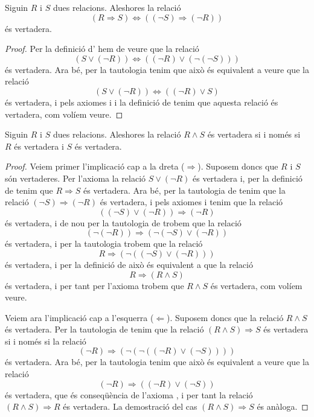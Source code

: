 \documentclass[../Apunts.tex]{subfiles}
\begin{document}
	\begin{tautology}
		\label{taut:llei de les contrarecíproques}
		Siguin \(R\) i \(S\) dues relacions. Aleshores la relació
		\[(R\Rightarrow S)\Leftrightarrow((\lnot S)\Rightarrow(\lnot R))\]
		és vertadera.
		\begin{proof}
			Per la definició d' hem de veure que la relació
			\[(S\lor(\lnot R))\Leftrightarrow((\lnot R)\lor(\lnot(\lnot S)))\]
			és vertadera. Ara bé, per la tautologia  tenim que això és equivalent a veure que la relació
			\[(S\lor(\lnot R))\Leftrightarrow((\lnot R)\lor S)\]
			és vertadera, i pels axiomes  i  i la definició de  tenim que aquesta relació és vertadera, com volíem veure.
		\end{proof}
	\end{tautology}
	\begin{tautology}
		\label{taut:condició equivalent a conjunció}
		Siguin \(R\) i \(S\) dues relacions. Aleshores la relació \(R\land S\) és vertadera si i només si \(R\) és vertadera i \(S\) és vertadera.
		\begin{proof}
			Veiem primer l'implicació cap a la dreta (\(\Rightarrow\)). Suposem doncs que \(R\) i \(S\) són vertaderes. Per l'axioma  la relació \(S\lor(\lnot R)\) és vertadera i, per la definició de  tenim que \(R\Rightarrow S\) és vertadera. Ara bé, per la tautologia de  tenim que la relació \((\lnot S)\Rightarrow(\lnot R)\) és vertadera, i pels axiomes  i  tenim que la relació
			\[((\lnot S)\lor(\lnot R))\Rightarrow(\lnot R)\]
			és vertadera, i de nou per la tautologia de  trobem que la relació
			\[(\lnot(\lnot R))\Rightarrow(\lnot(\lnot S)\lor(\lnot R))\]
			és vertadera, i per la tautologia  trobem que la relació
			\[R\Rightarrow(\lnot((\lnot S)\lor(\lnot R)))\]
			és vertadera, i per la definició de  això és equivalent a que la relació
			\[R\Rightarrow(R\land S)\]
			és vertadera, i per tant per l'axioma  trobem que \(R\land S\) és vertadera, com volíem veure.
			
			Veiem ara l'implicació cap a l'esquerra (\(\Leftarrow\)). Suposem doncs que la relació \(R\land S\) és vertadera. Per la tautologia de  tenim que la relació \((R\land S)\Rightarrow S\) és vertadera si i només si la relació
			\[(\lnot R)\Rightarrow(\lnot(\lnot((\lnot R)\lor(\lnot S))))\]
			és vertadera. Ara bé, per la tautologia  tenim que això és equivalent a veure que la relació
			\[(\lnot R)\Rightarrow((\lnot R)\lor(\lnot S))\]
			és vertadera, que és conseqüència de l'axioma , i per tant la relació \((R\land S)\Rightarrow R\) és vertadera. La demostració del cas \((R\land S)\Rightarrow S\) és anàloga.
		\end{proof}
	\end{tautology}
\end{document}
